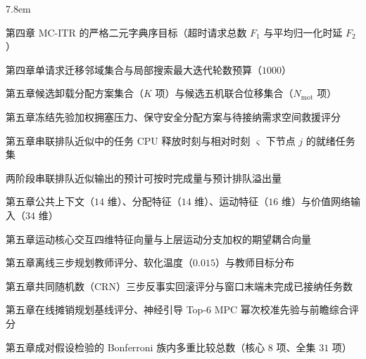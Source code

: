 \begin{notation}
\begin{notationlist}{7.8em}
    \item[{$F(\mathbf{a})=(F_1(\mathbf{a}),F_2(\mathbf{a}))$}] 第四章 MC-ITR 的严格二元字典序目标（超时请求总数 $F_1$ 与平均归一化时延 $F_2$）
    \item[$\mathcal{N}_1(\mathbf{a}),\ R_{\max}$] 第四章单请求迁移邻域集合与局部搜索最大迭代轮数预算（$1000$）
    \item[$\mathcal{K}(s),\ \mathcal{D}_{\mathrm{mot}}(s),\ N_{\mathrm{mot}}$] 第五章候选卸载分配方案集合（$K$ 项）与候选五机联合位移集合（$N_{\mathrm{mot}}$ 项）
    \item[$P(s),\ k_{\mathrm{safe}},\ R_{\mathrm{rescue}}(s,m)$] 第五章冻结先验加权拥塞压力、保守安全分配方案与待接纳需求空间救援评分
    \item[$\tilde{\varsigma}_{n,j}^{\mathrm{rel}},\ \tilde{\mathcal{C}}_j(\varsigma)$] 第五章串联排队近似中的任务 CPU 释放时刻与相对时刻 $\varsigma$ 下节点 $j$ 的就绪任务集
    \item[$\widehat{C}(s,k,m),\ \widehat{O}(s,k,m)$] 两阶段串联排队近似输出的预计可按时完成量与预计排队溢出量
    \item[$\mathbf{c}(s),\ \mathbf{a}_k,\ \mathbf{m}_{km},\ \mathbf{x}_V(s)$] 第五章公共上下文（$14$ 维）、分配特征（$14$ 维）、运动特征（$16$ 维）与价值网络输入（$34$ 维）
    \item[{$\boldsymbol{\phi}_{km},\ \mathbf{C}_{\mathrm{upper}}(s,k)$}] 第五章运动核心交互四维特征向量与上层运动分支加权的期望耦合向量
    \item[$Q_T(s,k,m),\ \tau_T,\ q_T(k,m\mid s)$] 第五章离线三步规划教师评分、软化温度（$0.015$）与教师目标分布
    \item[$Q_{\mathrm{cf}}(s,k,m),\ U^{(3)}$] 第五章共同随机数（CRN）三步反事实回滚评分与窗口末端未完成已接纳任务数
    \item[$Q_{\mathrm{amort}}(s,k,m),\ \widetilde{p}(k,m),\ J(s,k,m)$] 第五章在线摊销规划基线评分、神经引导 Top-6 MPC 幂次校准先验与前瞻综合评分
    \item[$N_{\mathrm{comp}}$] 第五章成对假设检验的 Bonferroni 族内多重比较总数（核心 $8$ 项、全集 $31$ 项）
  \end{notationlist}
\end{notation}
